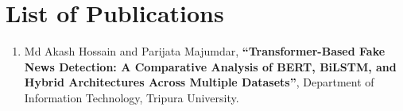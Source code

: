\sloppy
\pagestyle{fancy}
\chapter*{\centering List of Publications}

\begin{enumerate}
\item Md Akash Hossain and Parijata Majumdar, \textbf{``Transformer-Based Fake News Detection: A Comparative Analysis of BERT, BiLSTM, and Hybrid Architectures Across Multiple Datasets''}, Department of Information Technology, Tripura University.
\end{enumerate}
